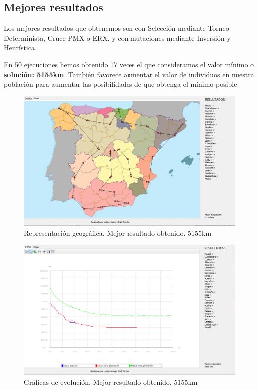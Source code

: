 \documentclass{article}
\begin{document}
\subsection{Mejores resultados}
Los mejores resultados que obtenemos son con Selección mediante Torneo Determinista, Cruce PMX o ERX, y con mutaciones mediante Inversión y Heurística.\par
En 50 ejecuciones hemos obtenido 17 veces el que consideramos el valor mínimo o \textbf{solución: 5155km}. También favorece aumentar el valor de individuos en nuestra población para aumentar las posibilidades de que obtenga el mínimo posible.
\begin{figure}[h]
	\centering
	\includegraphics[scale=0.35]{./images/best.png}
	\caption{Representación geográfica. Mejor resultado obtenido. 5155km}
\end{figure}

\begin{figure}[h]
	\centering
	\includegraphics[scale=0.35]{./images/best2.png}
	\caption{Gráficas de evolución. Mejor resultado obtenido. 5155km}
\end{figure}
\end{document}
